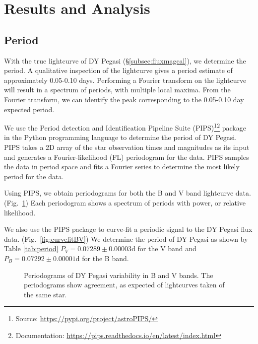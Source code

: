 \documentclass[twocolumn]{aastex631}
\begin{document}

\section{Results and Analysis} \label{sec:analysis}


\subsection{Period\label{subsec:period}}

With the true lightcurve of DY Pegasi (\S \ref{subsec:fluxmagcal}), we determine the period. A qualitative inspection of the lightcurve gives a period estimate of approximately 0.05-0.10 days. Performing a Fourier transform on the lightcurve will result in a spectrum of periods, with multiple local maxima. From the Fourier transform, we can identify the peak corresponding to the 0.05-0.10 day expected period.

We use the Period detection and Identification Pipeline Suite (PIPS)\footnote{Source: \url{https://pypi.org/project/astroPIPS/}}\footnote{Documentation: \url{https://pips.readthedocs.io/en/latest/index.html}} package in the Python programming language \citep{Murakami_2022} to determine the period of DY Pegasi. PIPS takes a 2D array of the star observation times and magnitudes as its input and generates a Fourier-likelihood (FL) periodogram for the data. PIPS samples the data in period space and fits a Fourier series to determine the most likely period for the data.

Using PIPS, we obtain periodograms for both the B and V band lightcurve data. (Fig.\ \ref{fig:periodogram}) Each periodogram shows a spectrum of periods with power, or relative likelihood.

We also use the PIPS package to curve-fit a periodic signal to the DY Pegasi flux data. (Fig.\ \ref{fig:curvefitBV}) We determine the period of DY Pegasi as shown by Table \ref{tab:period} $P_V = 0.07289 \pm 0.00003 \mathrm{d}$ for the V band and $P_B = 0.07292 \pm 0.00001 \mathrm{d}$ for the B band.

\begin{figure}
\caption{Periodograms of DY Pegasi variability in B and V bands. The periodograms show agreement, as expected of lightcurves taken of the same star. \label{fig:periodogram}}
\end{figure}
\end{document}
